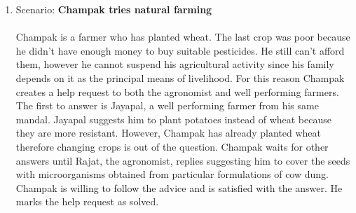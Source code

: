 \begin{enumerate}
\item Scenario: \textbf{Champak tries natural farming}\\\\
Champak is a farmer who has planted wheat. The last crop was poor because he didn't have enough money to buy suitable pesticides. He still can't afford them, however he cannot suspend his agricultural activity since his family depends on it as the principal means of livelihood. For this reason Champak creates a help request to both the agronomist and well performing farmers. The first to answer is Jayapal, a well performing farmer from his same mandal. Jayapal suggests him to plant potatoes instead of wheat because they are more resistant. However, Champak has already planted wheat therefore changing crops is out of the question. Champak waits for other answers until Rajat, the agronomist, replies suggesting him to cover the seeds with microorganisms obtained from particular formulations of cow dung. Champak is willing to follow the advice and is satisfied with the answer. He marks the help request as solved. 
\\


\end{enumerate}
